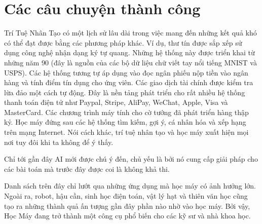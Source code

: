 \documentclass[letterpaper,11pt,english]{sphinxmanual}
\begin{document}








\section{Các câu chuyện thành công}
\label{\detokenize{chapter_introduction/index_vn:cac-cau-chuyen-thanh-cong}}


Trí Tuệ Nhân Tạo có một lịch sử lâu dài trong việc mang đến những kết
quả khó có thể đạt được bằng các phương pháp khác. Ví dụ, thư tín được
sắp xếp sử dụng công nghệ nhận dạng ký tự quang. Những hệ thống này được
triển khai từ những năm 90 (đây là nguồn của các bộ dữ liệu chữ viết tay
nổi tiếng MNIST và USPS). Các hệ thống tương tự áp dụng vào đọc ngân
phiếu nộp tiền vào ngân hàng và tính điểm tín dụng cho ứng viên. Các
giao dịch tài chính được kiểm tra lừa đảo một cách tự động. Đây là nền
tảng phát triển cho rất nhiều hệ thống thanh toán điện tử như Paypal,
Stripe, AliPay, WeChat, Apple, Visa và MasterCard. Các chương trình máy
tính cho cờ tướng đã phát triển hàng thập kỷ. Học máy đứng sau các hệ
thống tìm kiếm, gợi ý, cá nhân hóa và xếp hạng trên mạng Internet. Nói
cách khác, trí tuệ nhân tạo và học máy xuất hiện mọi nơi tuy đôi khi ta
không để ý thấy.



Chỉ tới gần đây AI mới được chú ý đến, chủ yếu là bởi nó cung cấp giải
pháp cho các bài toán mà trước đây được coi là không khả thi.


























Danh sách trên đây chỉ lướt qua những ứng dụng mà học máy có ảnh hưởng
lớn. Ngoài ra, robot, hậu cần, sinh học điện toán, vật lý hạt và thiên
văn học cũng tạo ra những thành quả ấn tượng gần đây phần nào nhờ vào
học máy. Bởi vậy, Học Máy đang trở thành một công cụ phổ biến cho các kỹ
sư và nhà khoa học.
\end{document}
